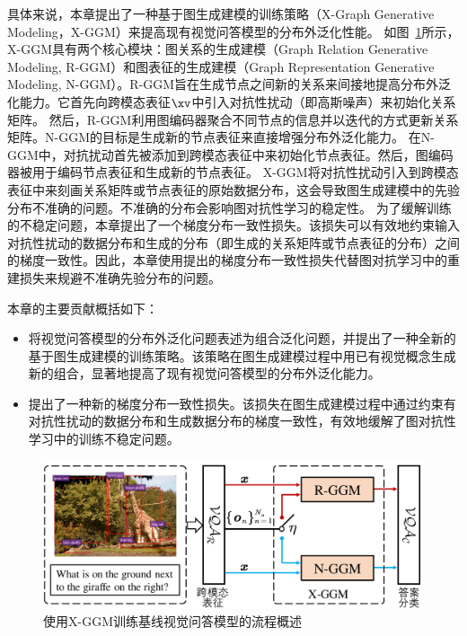 具体来说，本章提出了一种基于图生成建模的训练策略（X-Graph Generative Modeling，X-GGM）来提高现有视觉问答模型的分布外泛化性能。
如图~\ref{fig:c3_overview}所示，X-GGM具有两个核心模块：图关系的生成建模（Graph Relation Generative Modeling, R-GGM）和图表征的生成建模（Graph Representation Generative Modeling, N-GGM）。R-GGM旨在生成节点之间新的关系来间接地提高分布外泛化能力。它首先向跨模态表征$\xv$中引入对抗性扰动（即高斯噪声）来初始化关系矩阵。
然后，R-GGM利用图编码器聚合不同节点的信息并以迭代的方式更新关系矩阵。N-GGM的目标是生成新的节点表征来直接增强分布外泛化能力。
在N-GGM中，对抗扰动首先被添加到跨模态表征中来初始化节点表征。然后，图编码器被用于编码节点表征和生成新的节点表征。
X-GGM将对抗性扰动引入到跨模态表征中来刻画关系矩阵或节点表征的原始数据分布，这会导致图生成建模中的先验分布不准确的问题。不准确的分布会影响图对抗性学习的稳定性。
为了缓解训练的不稳定问题，本章提出了一个梯度分布一致性损失。该损失可以有效地约束输入对抗性扰动的数据分布和生成的分布（即生成的关系矩阵或节点表征的分布）之间的梯度一致性。因此，本章使用提出的梯度分布一致性损失代替图对抗学习中的重建损失来规避不准确先验分布的问题。

本章的主要贡献概括如下：
\begin{itemize}
\item 将视觉问答模型的分布外泛化问题表述为组合泛化问题，并提出了一种全新的基于图生成建模的训练策略。该策略在图生成建模过程中用已有视觉概念生成新的组合，显著地提高了现有视觉问答模型的分布外泛化能力。
\item 提出了一种新的梯度分布一致性损失。该损失在图生成建模过程中通过约束有对抗性扰动的数据分布和生成数据分布的梯度一致性，有效地缓解了图对抗性学习中的训练不稳定问题。
\end{itemize}


\begin{figure}[!t]
\centering
\includegraphics[width=0.8\linewidth]{figure/c3_view2.pdf}
\caption{使用X-GGM训练基线视觉问答模型的流程概述
}
\label{fig:c3_overview} 
\end{figure}




